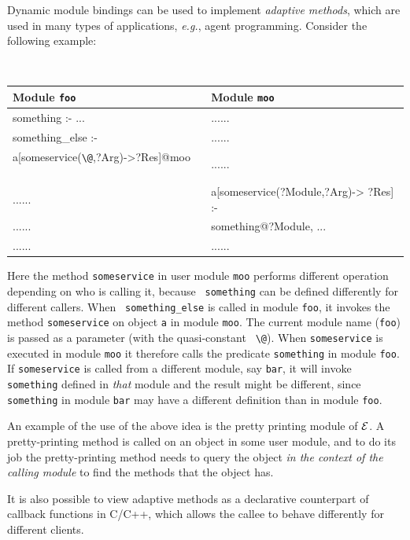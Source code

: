 \documentclass[11pt]{article}
\makeatletter
\newcommand{\ERGO}{\mbox{\ensuremath{\cal{E}}\smaller{{\sc{RGO}}}}\xspace}
\newcommand{\FLSYSTEM}{\ERGO}
\newcommand{\thismodule}{{\tt \bs{}@}\xspace}
\newcommand{\bs}{\textbackslash}
\makeatother
\begin{document}
Dynamic module bindings can be used to implement \emph{adaptive methods},
which are used in  many types of applications, {\it e.g.}, agent
programming. Consider the following example:
  \begin{center}
    {\tt
    \begin{tabular}{l l}
      Module {\tt foo}  & Module {\tt moo} \\
      \hline
      something :- ... & ......\\
      something\_else :- & ......\\
      \hspace*{1.5cm}a[someservice(\thismodule,?Arg)->?Res]@moo ~~& ......\\
      ...... & a[someservice(?Module,?Arg)-> ?Res] :- \\
      ...... & \hspace*{2.2cm} something@?Module, ...\\
      ...... & ......
      
    \end{tabular}
    }
  \end{center}
  
  Here the method {\tt someservice} in user module {\tt moo} performs
  different operation depending on who is calling it, because {\tt
    something} can be defined differently for different callers.  When {\tt
    something\_else} is called in module {\tt foo}, it invokes the method
  {\tt someservice} on object {\tt a} in module {\tt moo}. The current
  module name ({\tt foo}) is passed as a parameter (with the quasi-constant {\tt
  \bs{}@}). When {\tt someservice}
  is executed in module {\tt moo} it therefore calls the predicate {\tt something} in
  module {\tt foo}.
  If {\tt someservice} is called from a different module, say {\tt bar},  it will invoke
  {\tt something} defined in \emph{that} module and the result might be
  different, since {\tt something} in module {\tt bar} may have a different
  definition than in module {\tt foo}.      
  
  An example of the use of the above idea is the pretty printing module of
  \FLSYSTEM.
  A pretty-printing method is called on an object in some
  user module, and to do its job the pretty-printing method needs to query
  the object \emph{in the context of the calling module} to find the
  methods that the object has.

It is also possible to view adaptive methods as a declarative counterpart
of callback functions in C/C++, which allows the callee to behave
differently for different clients.
\end{document}
